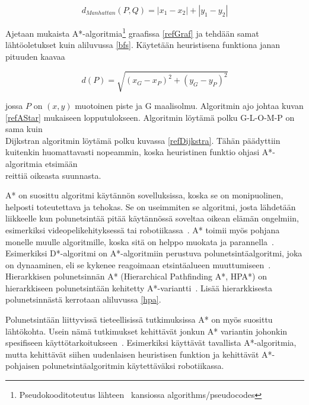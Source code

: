 \[ d_{Manhattan}(P,Q) =  |x_1 - x_2| + |y_1 - y_2|\]
\par

	Ajetaan \textcite{MathewAndMalathy} mukaista 
A*-algoritmia\footnote{Pseudokooditoteutus lähteen~\cite{gt2} kansiossa 
algorithms/pseudocodes} graafissa \ref{refGraf} ja tehdään samat 
lähtöoletukset kuin aliluvussa \ref{bfs}. Käytetään heuristisena funktiona 
janan pituuden kaavaa

\[ d(P) = \sqrt{(x_G-x_P)^2 + (y_G-y_P)^2} \]

\noindent jossa $P$ on $(x,y)$ muotoinen piste ja G maalisolmu. Algoritmin ajo 
johtaa kuvan \ref{refAStar} mukaiseen lopputulokseen. Algoritmin löytämä polku 
G-L-O-M-P on sama kuin \\ Dijkstran algoritmin löytämä polku kuvassa 
\ref{refDijkstra}. Tähän päädyttiin kuitenkin huomattavasti nopeammin, koska 
heuristinen funktio ohjasi A*-algoritmia etsimään \\ reittiä oikeasta 
suunnasta. \par
	A* on suosittu algoritmi käytännön sovelluksissa, koska se on 
monipuolinen, helposti toteutettava ja tehokas. Se on useimmiten se algoritmi, 
josta lähdetään \\ liikkeelle kun polunetsintää pitää käytännössä soveltaa 
oikean elämän ongelmiin, e\-si\-merkiksi videopelikehityksessä tai 
robotiikassa~\cite{ProcediaAStar}. A* toimii myös pohjana monelle muulle 
algoritmille, koska sitä on helppo muokata ja parannella~\cite{ProcediaAStar}. 
Esimerkiksi D*-algoritmi on A*-algoritmiin perustuva polunetsintäalgoritmi, 
joka on dynaaminen, eli se kykenee reagoimaan etsintäalueen 
muuttumiseen~\cite{applSciLawande}. Hierarkkisen polunetsinnän A* (Hierarchical 
Pathfinding A*, HPA*) on hierarkkiseen polunetsintään kehitetty 
A*-variantti~\cite{applSciLawande}. Lisää hierarkkisesta polunetsinnästä 
kerrotaan aliluvussa \ref{hpa}. \par
	Polunetsintään liittyvissä tieteellisissä tutkimuksissa A* on myös 
suosittu lähtö\-koh\-ta. Usein nämä tutkimukset kehittävät jonkun A* variantin 
johonkin spesifiseen käyttötarkoitukseen~\cite{ProcediaAStar}. Esimerkiksi 
\textcite{MathewAndMalathy} käyttävät tavallista A*-algoritmia, mutta 
kehittävät siihen uudenlaisen heuristisen funktion ja 
\textcite{DelaunayVoronoiAStar} kehittävät A*-pohjaisen polunetsintäalgoritmin 
käytettäväksi robotiikassa.

